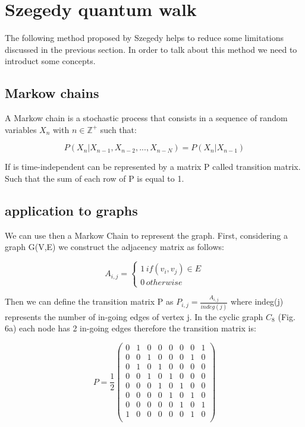 \section{Szegedy quantum walk}

The following method proposed by Szegedy helps to reduce some limitations discussed in the previous section. In order to 
talk about this method we need to introduct some concepts.

\subsection{Markow chains}

A Markow chain is a stochastic process that consists in a sequence of random variables $X_{n}$ with $n \in \mathbb{Z}^{+}$
such that:

\begin{equation}
    \scriptstyle P(X_{n} | X_{n-1}, X_{n-2},...,X_{n-N}) = P(X_{n} | X_{n-1})
\end{equation}

If is time-independent can be represented by a matrix P called transition matrix. Such that the sum of each row of P is equal to 1.

\subsection{application to graphs}

We can use then a Markow Chain to represent the graph. First, considering a graph G(V,E) we construct the adjacency matrix
as follows:

\begin{equation}
    A_{i,j} = 
    \begin{cases} 
        1\, if (v_{i}, v_{j}) \in E \\
        0\, otherwise
    \end{cases}
\end{equation}

Then we can define the transition matrix P as $P_{i,j} = \frac{A_{i,j}}{indeg(j)}$ where indeg(j) 
represents the number of in-going edges of vertex j. In the 
cyclic graph $C_{8}$ (Fig. 6a) each node has 2 in-going edges therefore the transition matrix is:

\begin{equation*}
    P = \frac{1}{2}
    \begin{pmatrix}
    0 & 1 & 0 & 0 & 0 & 0 & 0 & 1 \\
    0 & 0 & 1 & 0 & 0 & 0 & 1 & 0 \\
    0 & 1 & 0 & 1 & 0 & 0 & 0 & 0 \\
    0 & 0 & 1 & 0 & 1 & 0 & 0 & 0 \\
    0 & 0 & 0 & 1 & 0 & 1 & 0 & 0 \\
    0 & 0 & 0 & 0 & 1 & 0 & 1 & 0 \\
    0 & 0 & 0 & 0 & 0 & 1 & 0 & 1 \\
    1 & 0 & 0 & 0 & 0 & 0 & 1 & 0 \\
    \end{pmatrix}
\end{equation*}


